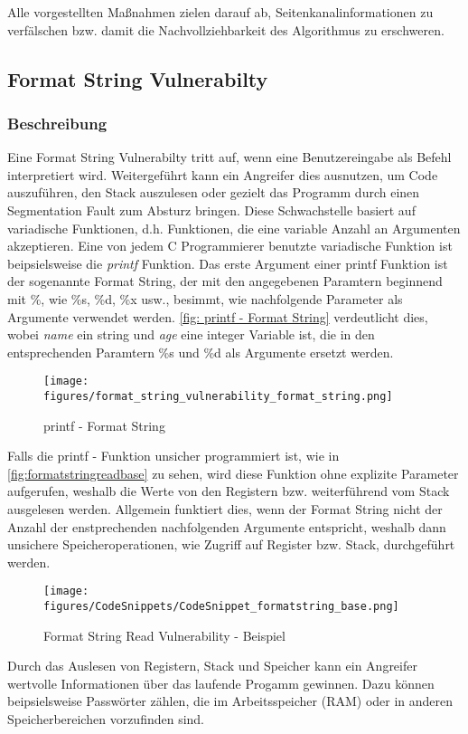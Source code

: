 \documentclass[a4paper,
DIV=13,
12pt,
BCOR=10mm,
department=FakIM,
oneside,
parskip=half,
automark,
listof=totocnumbered,
bibliography=totocnumbered,
acronym=totocnumbered
] {OTHRartcl}
\begin{document}
Alle vorgestellten Maßnahmen zielen darauf ab, Seitenkanalinformationen zu verfälschen bzw. damit die Nachvollziehbarkeit des Algorithmus zu erschweren.

\subsection{Format String Vulnerabilty}
\subsubsection{Beschreibung}
Eine Format String Vulnerabilty tritt auf, wenn eine Benutzereingabe als Befehl interpretiert wird.
Weitergeführt kann ein Angreifer dies ausnutzen, um Code auszuführen, den Stack auszulesen oder gezielt das Programm durch einen Segmentation Fault zum Absturz bringen.
Diese Schwachstelle basiert auf variadische Funktionen, d.h. Funktionen, die eine variable Anzahl an Argumenten akzeptieren.
Eine von jedem C Programmierer benutzte variadische Funktion ist beipsielsweise die \textit{printf} Funktion. \cite{OWASP Format String Vuln.}
Das erste Argument einer printf Funktion ist der sogenannte Format String, der mit den angegebenen Paramtern beginnend mit \%, wie \%s, \%d, \%x usw., besimmt, wie nachfolgende Parameter
als Argumente verwendet werden.
\autoref{fig: printf - Format String} verdeutlicht dies, wobei \textit{name} ein string und \textit{age} eine integer Variable ist, die in den entsprechenden
Paramtern \%s und \%d als Argumente ersetzt werden.
\begin{figure}[ht!]
  \begin{center}
    \texttt{[image: figures/format\_string\_vulnerability\_format\_string.png]}
    \caption{printf - Format String}
    \label{fig: printf - Format String}
  \end{center}
\end{figure}

Falls die printf - Funktion unsicher programmiert ist, wie in \autoref{fig:formatstringreadbase} zu sehen,
wird diese Funktion ohne explizite Parameter aufgerufen, weshalb die Werte von den Registern bzw. weiterführend vom Stack ausgelesen werden.
Allgemein funktiert dies, wenn der Format String nicht der Anzahl der enstprechenden nachfolgenden Argumente entspricht, weshalb dann unsichere Speicheroperationen, wie Zugriff auf Register bzw. Stack,
durchgeführt werden.
\begin{figure}[ht!]
  \begin{center}
    \texttt{[image: figures/CodeSnippets/CodeSnippet\_formatstring\_base.png]}
    \caption{Format String Read Vulnerability - Beispiel}
    \label{fig:formatstringreadbase}
  \end{center}
\end{figure}
Durch das Auslesen von Registern, Stack und Speicher kann ein Angreifer wertvolle Informationen über das laufende Progamm gewinnen.
Dazu können beipsielsweise Passwörter zählen, die im Arbeitsspeicher (RAM) oder in anderen Speicherbereichen vorzufinden sind.
\end{document}
